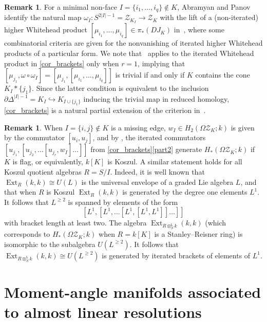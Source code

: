 \documentclass[a4paper,10pt]{amsart}
\theoremstyle{definition}
\newtheorem{remark}[theorem]{Remark}
\theoremstyle{remark}
\DeclareMathOperator{\Ext}{Ext}
\begin{document}
\begin{remark}
For a minimal non-face $I=\{i_1,\ldots,i_q\}\notin K$, Abramyan and Panov identify the natural map $\omega_I\colon S^{2|I|-1} = \mathcal{Z}_{K_I} \to \mathcal{Z}_K$ with the lift of a (non-iterated) higher Whitehead product $[\mu_{i_1},\ldots,\mu_{i_q}] \in \pi_*(DJ_K)$ in~\cite{AP}, where some combinatorial criteria are given for the nonvanishing of iterated higher Whitehead products of a particular form. We note that~\cite[Theorem~5.2]{AP} applies to the iterated Whitehead product in \cref{cor_brackets} only when $r=1$, implying that $[\mu_{j_1},\omega\circ\omega_I]=[\mu_{j_1},[\mu_{i_1},\ldots,\mu_{i_q}]]$ is trivial if and only if $K$ contains the cone $K_I*\{j_1\}$. Since the latter condition is equivalent to the inclusion $\partial\Delta^{|I|-1}=K_I \hookrightarrow K_{I\cup\{j_1\}}$ inducing the trivial map in reduced homology, \cref{cor_brackets} is a natural partial extension of the criterion in~\cite[Theorem~5.2]{AP}.
\end{remark}

\begin{remark}
When $I=\{i,j\} \notin K$ is a missing edge, $w_I\in H_2(\Omega\mathcal{Z}_K;k)$ is given by the commutator $[u_i,u_j]$, and by \cite[Theorem~4.3]{GPTW}, the iterated commutators $[u_{j_1},[u_{j_2},\ldots[u_{j_r},w_I]\ldots]]$ from \cref{cor_brackets}\ref{part2} generate $H_*(\Omega\mathcal{Z}_K;k)$ if $K$ is flag, or equivalently, $k[K]$ is Koszul. A similar statement holds for all Koszul quotient algebras $R=S/I$. Indeed, it is well known that $\Ext_R(k,k)\cong U(L)$ is the universal envelope of a graded Lie algebra $L$, and that when $R$ is Koszul $\Ext_R(k,k)$ is generated by the degree one elements $L^1$. It follows that $L^{\geqslant 2}$ is spanned by elements of the form
\[
[L^1,[L^1,\ldots[L^1,[L^1,L^1]]\ldots]]
\]
with bracket length at least two. The algebra $\Ext_{R\otimes^\mathsf{L}_Sk}(k,k)$ (which corresponds to $H_*(\Omega\mathcal{Z}_K;k)$ when $R=k[K]$ is a Stanley--Reisner ring) is isomorphic to the subalgebra $U(L^{\geqslant 2})$. It follows that $\Ext_{R\otimes^\mathsf{L}_Sk}(k,k)\cong U(L^{\geqslant 2})$ is generated by iterated brackets of elements of $L^1$.
\end{remark} 



\section{Moment-angle manifolds associated to almost linear resolutions}
\label{sec_manifolds}
\end{document}
